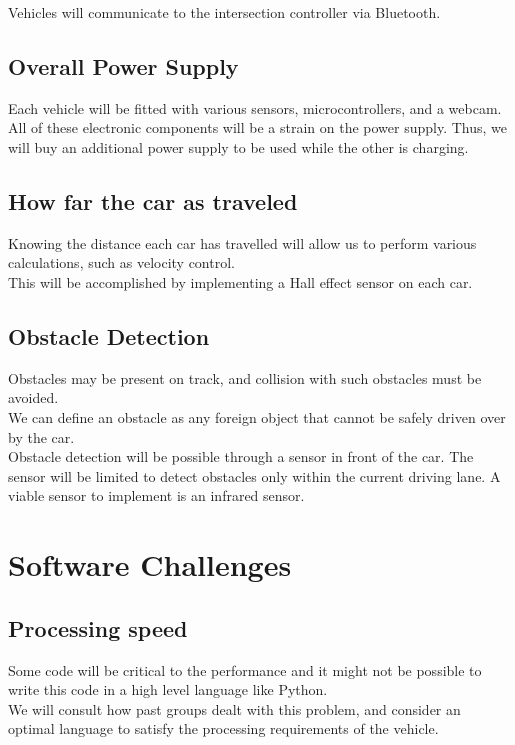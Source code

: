 \documentclass [11pt]{article}
\begin{document}
 Vehicles will communicate to the intersection controller via Bluetooth.

\subsection{Overall Power Supply}
 Each vehicle will be fitted with various sensors, microcontrollers, and a webcam. All of these electronic components will be a strain on the power supply. Thus,  we will buy an additional power supply to be used while the other is charging. 

\subsection{How far the car as traveled}
Knowing the distance each car has travelled will allow us to perform various calculations, such as velocity control. \\
This will be accomplished by implementing a Hall effect sensor on each car.


\subsection{Obstacle Detection}
Obstacles may be present on track, and collision with such obstacles must be avoided. \\
We can define an obstacle as any foreign object that cannot be safely driven over by the car. \\
Obstacle detection will be possible through a sensor in front of the car. The sensor will be limited to detect obstacles only within the current driving lane. A viable sensor to implement is an infrared sensor. 



\section {Software Challenges}
\subsection{Processing speed}
Some code will be critical to the performance and it might not be possible to write this code in a high level language like Python. \\We will consult how past groups dealt with this problem, and consider an optimal language to satisfy the processing requirements of the vehicle.
 
\end{document}
